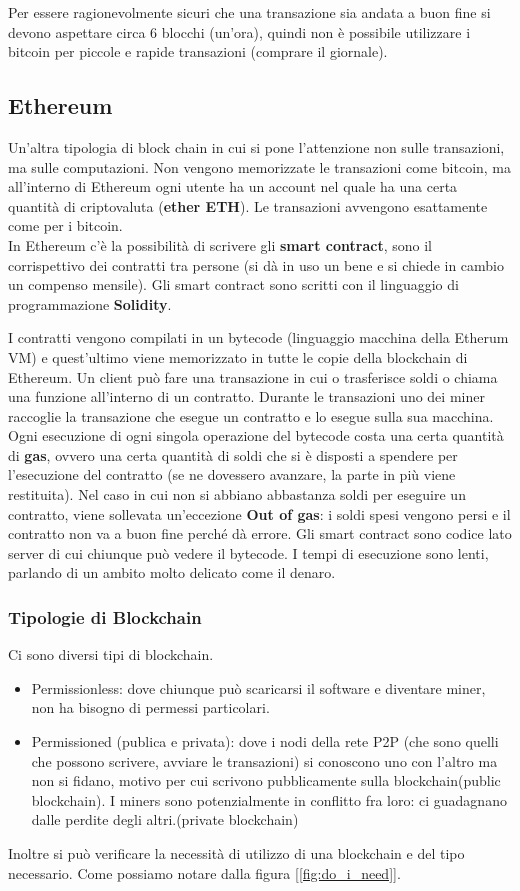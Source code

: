 Per essere ragionevolmente sicuri che una transazione sia andata a buon fine si devono aspettare circa 6 blocchi (un’ora), quindi non è possibile utilizzare i bitcoin per piccole e rapide transazioni (comprare il giornale).

\subsection{Ethereum}
Un'altra tipologia di block chain in cui si pone l’attenzione non sulle transazioni, ma sulle computazioni. Non vengono memorizzate le transazioni come bitcoin, ma all’interno di Ethereum ogni utente ha un account nel quale ha una certa quantità di criptovaluta (\textbf{ether ETH}). Le transazioni avvengono esattamente come per i bitcoin.\\ 
In Ethereum c’è la possibilità di scrivere gli \textbf{smart contract}, sono il corrispettivo dei contratti tra persone (si dà in uso un bene e si chiede in cambio un compenso mensile). Gli smart contract sono scritti con il linguaggio di programmazione \textbf{Solidity}.

I contratti vengono compilati in un bytecode (linguaggio macchina della Etherum VM) e quest’ultimo viene memorizzato in tutte le copie della blockchain di Ethereum. Un client può fare una transazione in cui o trasferisce soldi o chiama una funzione all’interno di un contratto. Durante le transazioni uno dei miner raccoglie la transazione che esegue un contratto e lo esegue sulla sua macchina. Ogni esecuzione di ogni singola operazione del bytecode costa una certa quantità di \textbf{gas}, ovvero una certa quantità di soldi che si è disposti a spendere per l’esecuzione del contratto (se ne dovessero avanzare, la parte in più viene restituita). Nel caso in cui non si abbiano abbastanza soldi per eseguire un contratto, viene sollevata un’eccezione \textbf{Out of gas}: i soldi spesi vengono persi e il contratto non va a buon fine perché dà errore.
Gli smart contract sono codice lato server di cui chiunque può vedere il bytecode. I tempi di esecuzione sono lenti, parlando di un ambito molto delicato come il denaro. 

\subsubsection{Tipologie di Blockchain}
Ci sono diversi tipi di blockchain.
\begin{itemize}
    \item Permissionless: dove chiunque può scaricarsi il software e diventare miner, non ha bisogno di permessi particolari.
    \item Permissioned (publica e privata): dove i nodi della rete P2P (che sono quelli che possono scrivere, avviare le transazioni) si conoscono uno con l’altro ma non si fidano, motivo per cui scrivono pubblicamente sulla blockchain(public blockchain). 
    I miners sono potenzialmente in conflitto fra loro: ci guadagnano dalle perdite degli altri.(private blockchain)
\end{itemize}
Inoltre si può verificare la necessità di utilizzo di una blockchain e del tipo necessario. Come possiamo notare dalla figura [\ref{fig:do_i_need}]. 

